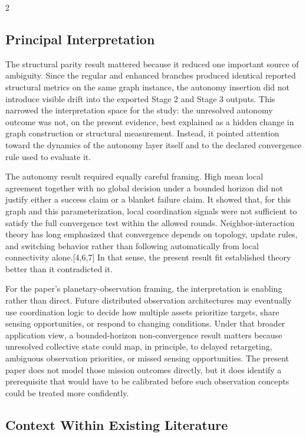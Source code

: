 \documentclass[fleqn,10pt,letterpaper]{article}
\begin{document}
\begin{multicols}{2}
\subsection{Principal Interpretation}

The structural parity result mattered because it reduced one important source of ambiguity. Since the regular and enhanced branches produced identical reported structural metrics on the same graph instance, the autonomy insertion did not introduce visible drift into the exported Stage 2 and Stage 3 outputs. This narrowed the interpretation space for the study: the unresolved autonomy outcome was not, on the present evidence, best explained as a hidden change in graph construction or structural measurement. Instead, it pointed attention toward the dynamics of the autonomy layer itself and to the declared convergence rule used to evaluate it.

The autonomy result required equally careful framing. High mean local agreement together with no global decision under a bounded horizon did not justify either a success claim or a blanket failure claim. It showed that, for this graph and this parameterization, local coordination signals were not sufficient to satisfy the full convergence test within the allowed rounds. Neighbor-interaction theory has long emphasized that convergence depends on topology, update rules, and switching behavior rather than following automatically from local connectivity alone.[4,6,7] In that sense, the present result fit established theory better than it contradicted it.

For the paper's planetary-observation framing, the interpretation is enabling rather than direct. Future distributed observation architectures may eventually use coordination logic to decide how multiple assets prioritize targets, share sensing opportunities, or respond to changing conditions. Under that broader application view, a bounded-horizon non-convergence result matters because unresolved collective state could map, in principle, to delayed retargeting, ambiguous observation priorities, or missed sensing opportunities. The present paper does not model those mission outcomes directly, but it does identify a prerequisite that would have to be calibrated before such observation concepts could be treated more confidently.


\subsection{Context Within Existing Literature}


\end{multicols}
\end{document}
